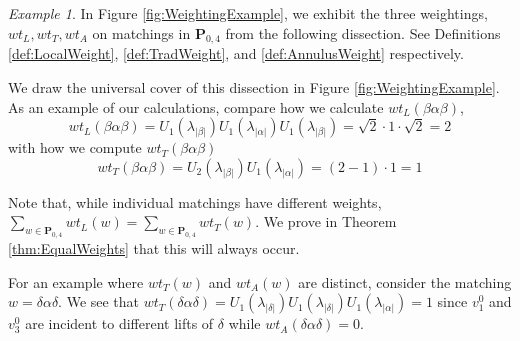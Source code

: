\documentclass[12pt]{article}
\theoremstyle{remark}
\newtheorem{example}{Example}
\newcommand*{\pathset}[2]{\mathbf{P}_{#1,#2}}
\begin{document}
\begin{example}\label{ex:Matchings}
In Figure \ref{fig:WeightingExample}, we exhibit the three weightings, $wt_L, wt_T, wt_A$ on matchings in $\pathset{0}{4}$ from the following dissection. See Definitions \ref{def:LocalWeight}, \ref{def:TradWeight}, and \ref{def:AnnulusWeight} respectively. 

\begin{center}
\end{center}

We draw the universal cover of this dissection in Figure \ref{fig:WeightingExample}. As an example of our calculations, compare how we calculate $wt_L(\beta\alpha\beta)$, \[
wt_L(\beta\alpha\beta) = U_1(\lambda_{\vert \beta \vert}) U_1(\lambda_{\vert \alpha \vert}) U_1(\lambda_{\vert \beta \vert}) = \sqrt{2} \cdot 1 \cdot \sqrt{2} = 2
\]
with how we compute $wt_T(\beta\alpha\beta)$
\[wt_T(\beta\alpha\beta) = U_2(\lambda_{\vert \beta \vert}) U_1(\lambda_{\vert \alpha \vert}) = (2 - 1)\cdot 1 = 1
\]

Note that, while individual matchings have different weights, $\sum_{w \in \pathset{0}{4}} wt_L(w) = \sum_{w\in\pathset{0}{4}} wt_T(w)$.  We prove in Theorem \ref{thm:EqualWeights} that this will always occur.

 For an example where $wt_T(w)$ and $wt_A(w)$ are distinct, consider the matching $w = \delta\alpha\delta$. We see that $wt_T(\delta\alpha\delta) = U_1(\lambda_{\vert \delta \vert}) U_1(\lambda_{\vert \delta \vert}) U_1(\lambda_{\vert \alpha \vert}) = 1$ since $v_1^0$ and $v_3^0$ are incident to different lifts of $\delta$ while $wt_A(\delta\alpha\delta) = 0$. 


\end{example}
\end{document}
